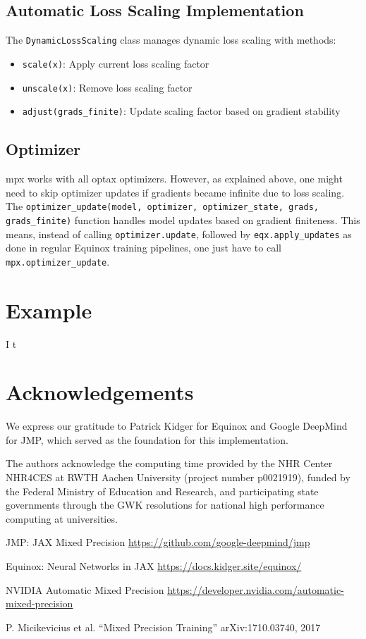 \documentclass[11pt,a4paper]{article}
\begin{document}
\subsection{Automatic Loss Scaling Implementation}
The \texttt{DynamicLossScaling} class manages dynamic loss scaling with methods:
\begin{itemize}
    \item \texttt{scale(x)}: Apply current loss scaling factor
    \item \texttt{unscale(x)}: Remove loss scaling factor
    \item \texttt{adjust(grads\_finite)}: Update scaling factor based on gradient stability
\end{itemize}

\subsection{Optimizer}
mpx works with all optax optimizers. However, as explained above, one might need to skip optimizer updates if gradients became infinite due to loss scaling.
The  \texttt{optimizer\_update(model, optimizer, optimizer\_state, grads, grads\_finite)} function handles model updates based on gradient finiteness.
This means, instead of calling \texttt{optimizer.update}, followed by \texttt{eqx.apply\_updates} as done in regular Equinox training pipelines, one just have to call \texttt{mpx.optimizer\_update}.

\section{Example}
I t

\section{Acknowledgements}
We express our gratitude to Patrick Kidger for Equinox and Google DeepMind for JMP, which served as the foundation for this implementation.

The authors acknowledge the computing time provided by the NHR Center NHR4CES at RWTH Aachen University (project number p0021919), funded by the Federal Ministry of Education and Research, and participating state governments through the GWK resolutions for national high performance computing at universities.

\begin{thebibliography}{9}
JMP: JAX Mixed Precision
\newblock \url{https://github.com/google-deepmind/jmp}

Equinox: Neural Networks in JAX
\newblock \url{https://docs.kidger.site/equinox/}

NVIDIA Automatic Mixed Precision
\newblock \url{https://developer.nvidia.com/automatic-mixed-precision}

P. Micikevicius et al.
\newblock ``Mixed Precision Training''
\newblock arXiv:1710.03740, 2017
\end{thebibliography}
\end{document}
